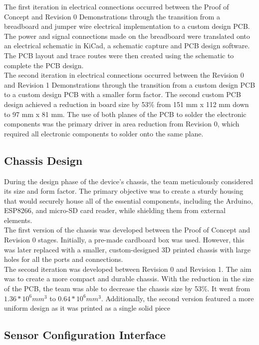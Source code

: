 \documentclass[12pt]{article}
\begin{document}
The first iteration in electrical connections occurred between the Proof of Concept and Revision 0 Demonstrations through the transition from a breadboard and jumper wire electrical implementation to a custom design PCB. The power and signal connections made on the breadboard were translated onto an electrical schematic in KiCad, a schematic capture and PCB design software. The PCB layout and trace routes were then created using the schematic to complete the PCB design. \\

The second iteration in electrical connections occurred between the Revision 0 and Revision 1 Demonstrations through the transition from a custom design PCB to a custom design PCB with a smaller form factor. The second custom PCB design achieved a reduction in board size by 53\% from 151 mm x 112 mm down to 97 mm x 81 mm. The use of both planes of the PCB to solder the electronic components was the primary driver in area reduction from Revision 0, which required all electronic components to solder onto the same plane. \\

\subsection{Chassis Design}
During the design phase of the device's chassis, the team meticulously considered its size and form factor. The primary objective was to create a sturdy housing that would securely house all of the essential components, including the Arduino, ESP8266, and micro-SD card reader, while shielding them from external elements.\\

The first version of the chassis was developed between the Proof of Concept and Revision 0 stages. Initially, a pre-made cardboard box was used. However, this was later replaced with a smaller, custom-designed 3D printed chassis with large holes for all the ports and connections.\\

The second iteration was developed between Revision 0 and Revision 1. The aim was to create a more compact and durable chassis. With the reduction in the size of the PCB, the team was able to decrease the chassis size by 53\%. It went from $1.36*10^6 mm^3$ to $0.64*10^6mm^3$. Additionally, the second version featured a more uniform design as it was printed as a single solid piece
\subsection{Sensor Configuration Interface}
\end{document}
